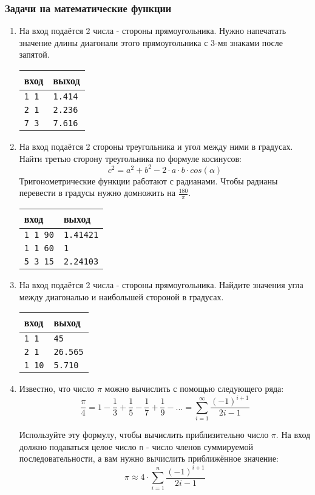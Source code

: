 \documentclass{article}
\begin{document}
\subsubsection*{Задачи на математические функции}
\begin{enumerate}
\item На вход подаётся 2 числа - стороны прямоугольника. Нужно напечатать значение длины диагонали этого прямоугольника с 3-мя знаками после запятой.
\begin{center}
\begin{tabular}{ l l }
 вход & выход \\ \hline
 \texttt{1 1} & \texttt{1.414}  \\ 
 \texttt{2 1} & \texttt{2.236}  \\ 
 \texttt{7 3} & \texttt{7.616}  \\
\end{tabular}
\end{center}

\item На вход подаётся 2 стороны треугольника и угол между ними в градусах. Найти третью сторону треугольника по формуле косинусов:
$$
c^2 = a^2 + b^2 - 2 \cdot a \cdot b \cdot cos(\alpha)
$$
Тригонометрические функции работают с радианами. Чтобы радианы перевести в градусы нужно домножить на $\frac{180}{\pi}$. 
\begin{center}
\begin{tabular}{ l l }
 вход & выход \\ \hline
 \texttt{1 1 90} & \texttt{1.41421}  \\ 
 \texttt{1 1 60} & \texttt{1}  \\ 
 \texttt{5 3 15} & \texttt{2.24103}  \\
\end{tabular}
\end{center}
\item На вход подаётся 2 числа - стороны прямоугольника. Найдите значения угла между диагональю и наибольшей стороной в градусах. 
\begin{center}
\begin{tabular}{ l l }
 вход & выход \\ \hline
 \texttt{1 1} & \texttt{45}  \\ 
 \texttt{2 1} & \texttt{26.565}  \\ 
 \texttt{1 10} & \texttt{5.710}  \\
\end{tabular}
\end{center}
\item Известно, что число $\pi$ можно вычислить с помощью следующего ряда:
$$
\frac{\pi}{4} = 1 - \frac{1}{3} + \frac{1}{5} - \frac{1}{7} + \frac{1}{9} - ... = \sum_{i=1}^{\infty} \frac{(-1)^{i + 1}}{2i-1}
$$

Используйте эту формулу, чтобы вычислить приблизительно число $\pi$. На вход должно подаваться целое число \texttt{n} - число членов суммируемой последовательности, а вам нужно вычислить приближённое значение:
$$
\pi \approx 4 \cdot \sum_{i=1}^{n} \frac{(-1)^{i + 1}}{2i-1}
$$
\end{enumerate}
\end{document}

